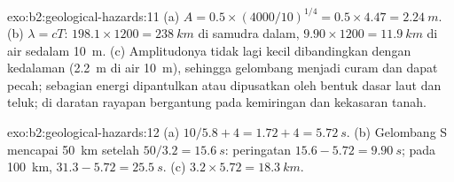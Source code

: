 \begin{solution}{exo:b2:geological-hazards:11}
(a) $A = 0.5 \times (4000/10)^{1/4} = 0.5 \times 4.47 = \qty{2.24}{m}$. (b) $\lambda = cT$:
$198.1 \times 1200 = \qty{238}{km}$ di samudra dalam, $9.90 \times 1200 = \qty{11.9}{km}$ di
air sedalam \qty{10}{m}. (c) Amplitudonya tidak lagi kecil dibandingkan dengan kedalaman (\qty{2.2}{m} di
air \qty{10}{m}), sehingga gelombang menjadi curam dan dapat pecah; sebagian energi dipantulkan atau dipusatkan oleh
bentuk dasar laut dan teluk; di daratan rayapan bergantung pada kemiringan dan kekasaran
tanah.
\end{solution}

\begin{solution}{exo:b2:geological-hazards:12}
(a) $10/5.8 + 4 = 1.72 + 4 = \qty{5.72}{s}$. (b) Gelombang S mencapai \qty{50}{km} setelah $50/3.2 =
\qty{15.6}{s}$: peringatan $15.6 - 5.72 = \qty{9.90}{s}$; pada \qty{100}{km}, $31.3 - 5.72 =
\qty{25.5}{s}$. (c) $3.2 \times 5.72 = \qty{18.3}{km}$.
\end{solution}


